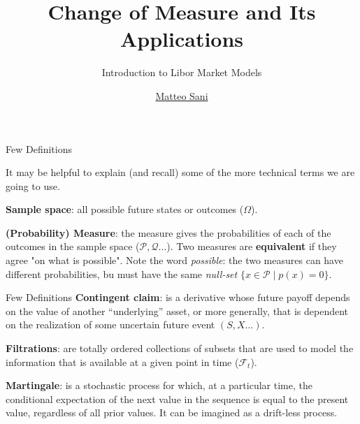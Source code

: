 \documentclass{beamer}
\title{Change of Measure and Its Applications}
\subtitle{Introduction to Libor Market Models}
\author{\href{mailto:matteosan1@gmail.com}{Matteo Sani}}
\begin{document}
	\begin{frame}[plain]
		\maketitle
	\end{frame}

\begin{frame}{Few Definitions}


It may be helpful to explain (and recall) some of the more technical terms we are going to use.\newline

\textbf{Sample space}: all possible future states or outcomes ($\Omega$).\newline

\textbf{(Probability) Measure}: the measure gives the probabilities of each of the outcomes in the sample space ($\mathcal{P}, \mathcal{Q}\ldots$). Two measures are \textbf{equivalent} if they agree "on what is possible". Note the word \emph{possible}: the two measures can have different probabilities, bu must have the same \emph{null-set} $\{x\in {\mathcal {P}}\mid p (x)=0\}$. 
\end{frame}

\begin{frame}{Few Definitions}
\textbf{Contingent claim}: is a derivative whose future payoff depends on the value of another “underlying” asset, or more generally, that is dependent on the realization of some uncertain future event $(S, X\ldots)$.\newline

\textbf{Filtrations}: are totally ordered collections of subsets that are used to model the information that is available at a given point in time ($\mathcal{F}_t$). \newline

\textbf{Martingale}: is a stochastic process for which, at a particular time, the conditional expectation of the next value in the sequence is equal to the present value, regardless of all prior values. It can be imagined as a drift-less process.
\end{frame}
\end{document}
